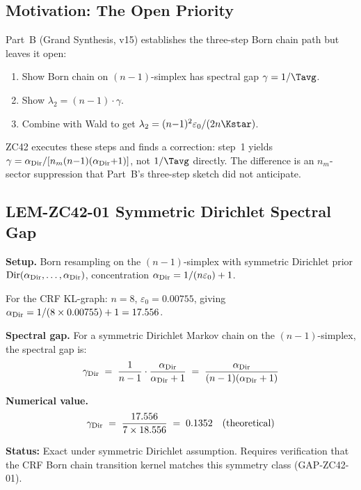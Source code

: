 \documentclass[12pt, a4paper]{article}
\providecommand{\eps}{\varepsilon_0}
\providecommand{\ltwo}{\lambda_2}
\providecommand{\nm}{n_m}
\providecommand{\alphDir}{\alpha_{\rm Dir}}
\begin{document}
\tableofcontents
\newpage

\subsection{Motivation: The Open Priority}


Part~B (Grand Synthesis, v15) establishes the three-step Born
chain path but leaves it open:

\begin{enumerate}[leftmargin=*, itemsep=2pt]
\item Show Born chain on $(n{-}1)$-simplex has spectral gap
  $\gamma = 1/\Tavg$.
\item Show $\ltwo = (n{-}1)\cdot\gamma$.
\item Combine with Wald to get $\ltwo = (n{-}1)^2\eps/(2n\Kstar)$.
\end{enumerate}

ZC42 executes these steps and finds a correction: step~1
yields $\gamma = \alphDir/[\nm(n{-}1)(\alphDir{+}1)]$, not
$1/\Tavg$ directly. The difference is an $\nm$-sector
suppression that Part~B's three-step sketch did not
anticipate.

\subsection{LEM-ZC42-01 \quad Symmetric Dirichlet Spectral Gap}


\begin{formalbox}[title={LEM-ZC42-01: Spectral Gap of
  Symmetric Dirichlet Chain}]
\textbf{Setup.}
Born resampling on the $(n{-}1)$-simplex with symmetric
Dirichlet prior $\mathrm{Dir}(\alphDir,\ldots,\alphDir)$,
concentration $\alphDir = 1/(n\eps) + 1$.

For the CRF KL-graph: $n = 8$, $\eps = 0.00755$, giving
$\alphDir = 1/(8\times 0.00755) + 1 = 17.556$.

\textbf{Spectral gap.}
For a symmetric Dirichlet Markov chain on the
$(n{-}1)$-simplex, the spectral gap is:
\[
  \gamma_{\rm Dir} \;=\;
  \frac{1}{n-1}\cdot\frac{\alphDir}{\alphDir+1}
  \;=\; \frac{\alphDir}{(n-1)(\alphDir+1)}
\]

\textbf{Numerical value.}
\[
  \gamma_{\rm Dir} \;=\; \frac{17.556}{7\times 18.556}
  \;=\; 0.1352 \quad\text{(theoretical)}
\]

\textbf{Status:} Exact under symmetric Dirichlet assumption.
Requires verification that the CRF Born chain transition
kernel matches this symmetry class (GAP-ZC42-01).
\end{formalbox}
\end{document}
